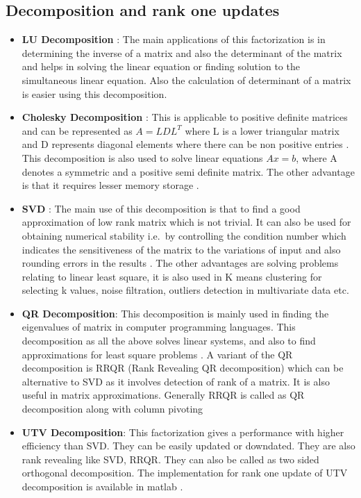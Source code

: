 \subsection{Decomposition and rank one updates}
\begin{itemize}
	\item \textbf{LU Decomposition} : The main applications of this factorization is in determining the inverse of a matrix and also the determinant of the matrix \color{red}\cite{}\color{black} and helps in solving the linear equation or finding solution to the simultaneous linear equation. Also the calculation of determinant of a matrix is easier using this decomposition.
	\item \textbf{Cholesky Decomposition} : This is applicable to positive definite matrices and can be represented as $A = LDL^{T}$ where L is a lower triangular matrix and D represents diagonal elements where there can be non positive entries \cite{higham2009cholesky}. This decomposition is also used to solve linear equations $Ax = b$, where A denotes a symmetric and a positive semi definite matrix. The other advantage is that it requires lesser memory storage \cite{higham2009cholesky}. 
	\item \textbf{SVD} : The main use of this decomposition is that to find a good approximation of low rank matrix which is not trivial. It can also be used for obtaining numerical stability i.e.\ by controlling the condition number which indicates the sensitiveness of the matrix to the variations of input and also rounding errors in the results \cite{sonnberger1989regression}. The other advantages are solving problems relating to linear least square, it is also used in K means clustering for selecting k values, noise filtration, outliers detection in multivariate data etc.\ \cite{slides} 
	\item \textbf{QR Decomposition}: This decomposition is mainly used in finding the eigenvalues of matrix in computer programming languages. This decomposition as all the above solves linear systems, and also to find approximations for least square problems \cite{slides}. A variant of the QR decomposition is RRQR (Rank Revealing QR decomposition) which can be alternative to SVD as it involves detection of rank of a matrix. It is also useful in matrix approximations. Generally RRQR is called as QR decomposition along with column pivoting ~\cite{hong1992rank}
	\item \textbf{UTV Decomposition}: This factorization gives a performance with higher efficiency than SVD. They can be easily updated or downdated. They are also rank revealing like SVD, RRQR. They can also be called as two sided orthogonal decomposition. The implementation for rank one update of UTV decomposition is available in matlab \cite{fierro1999utv}.

\end{itemize}
